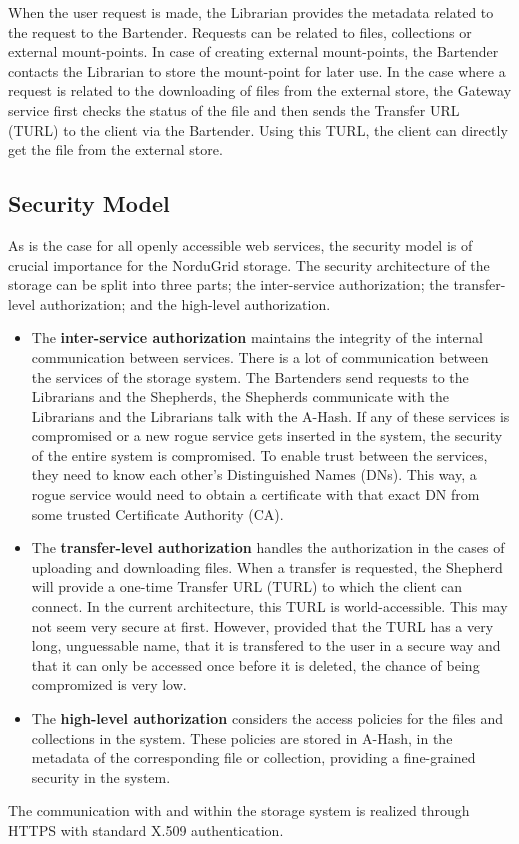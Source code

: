 \documentclass[final]{ieee}
\begin{document}
When the user request is made, the Librarian provides the metadata related
to the request to the Bartender. Requests can be related to
files, collections or external mount-points. In case of creating
external mount-points, the Bartender contacts the Librarian to store
the mount-point for later use. In the case where a request is related
to the downloading of files from the external store, the Gateway service first checks the status of the file
and then sends the Transfer URL (TURL) to the client via the
Bartender. Using this TURL, the client can directly get the file from
the external store. %

\subsection{Security Model }
\label{Security Model }

As is the case for all openly accessible web services, the security
model is of crucial importance for the NorduGrid storage. The security
architecture of the storage can be split into three parts; the
inter-service authorization; the transfer-level authorization; and the
high-level authorization.
\begin{itemize}
\item The \textbf{inter-service authorization} maintains the integrity of the
  internal communication between services. There is a lot of
  communication between the services of the storage system. The
  Bartenders send requests to the Librarians and the Shepherds, the
  Shepherds communicate with the Librarians and the Librarians talk with
  the A-Hash. If any of these services is compromised or a new
  rogue service gets inserted in the system, the security of the
  entire system is compromised. To enable trust between the services,
  they need to know each other's Distinguished Names (DNs). This way,
  a rogue service would need to obtain a certificate with that exact
  DN from some trusted Certificate Authority (CA).
\item The \textbf{transfer-level authorization} handles the
  authorization in the cases of uploading and downloading files. When
  a transfer is requested, the Shepherd will provide a one-time
  Transfer URL (TURL) to which the client can connect. In the
  current architecture, this TURL is world-accessible. This may not seem
  very secure at first. However, provided that the TURL has a very long,
  unguessable name, that it is transfered to the user in a secure way
  and that it can only be accessed once before it is deleted, the
  chance of being compromized is very low.
\item The \textbf{high-level authorization} considers the access
  policies for the files and collections in the system. These policies
  are stored in A-Hash, in the metadata of the corresponding file or
  collection, providing a fine-grained security in the system.
\end{itemize}
The communication with and within the storage system is realized
through HTTPS with standard X.509 authentication.
\end{document}
